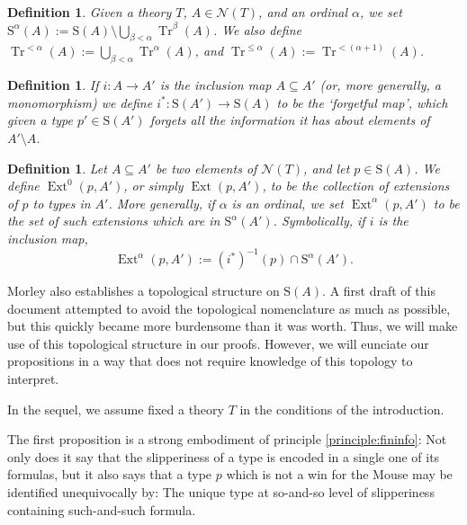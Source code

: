 \documentclass{article}
\newtheorem{definition}[theorem]{Definition}
\theoremstyle{nonumberplain}
\newcommand{\calN}{\mathcal{N}}
\newcommand{\Stone}{\mathrm{S}}
\DeclareMathOperator{\Tr}{Tr}
\DeclareMathOperator{\Ext}{Ext}
\begin{document}
\begin{definition}
Given a theory $T$, $A \in \calN(T)$, and an ordinal $\alpha$, we set $\Stone^\alpha(A) := \Stone(A) \setminus \bigcup_{\beta < \alpha} \Tr^\beta(A)$. We also define $\Tr^{<\alpha}(A) := \bigcup_{\beta < \alpha} \Tr^\alpha(A)$, and $\Tr^{\leq\alpha}(A) := \Tr^{<(\alpha+1)}(A)$.
\end{definition}

\begin{definition}
If $i \colon A \to A'$ is the inclusion map $A \subseteq A'$ (or, more generally, a monomorphism) we define $i^* \colon \Stone(A') \to \Stone(A)$ to be the `forgetful map', which given a type $p' \in \Stone(A')$ forgets all the information it has about elements of $A' \setminus A$.
\end{definition}

\begin{definition}
Let $A \subseteq A'$ be two elements of $\calN(T)$, and let $p \in \Stone(A)$. We define $\Ext^0(p, A')$, or simply $\Ext(p,A')$, to be the collection of extensions of $p$ to types in $A'$. More generally, if $\alpha$ is an ordinal, we set $\Ext^\alpha(p, A')$ to be the set of such extensions which are in $\Stone^\alpha(A')$. Symbolically, if $i$ is the inclusion map,
\begin{equation}
\Ext^\alpha(p,A') := (i^*)^{-1}(p) \cap \Stone^\alpha(A').
\end{equation}
\end{definition}

Morley also establishes a topological structure on $\Stone(A)$. A first draft of this document attempted to avoid the topological nomenclature as much as possible, but this quickly became more burdensome than it was worth. Thus, we will make use of this topological structure in our proofs. However, we will eunciate our propositions in a way that does not require knowledge of this topology to interpret.

In the sequel, we assume fixed a theory $T$ in the conditions of the introduction.

The first proposition is a strong embodiment of principle \ref{principle:fininfo}: Not only does it say that the slipperiness of a type is encoded in a single one of its formulas, but it also says that a type $p$ which is not a win for the Mouse may be identified unequivocally by: The unique type at so-and-so level of slipperiness containing such-and-such formula.
\end{document}
